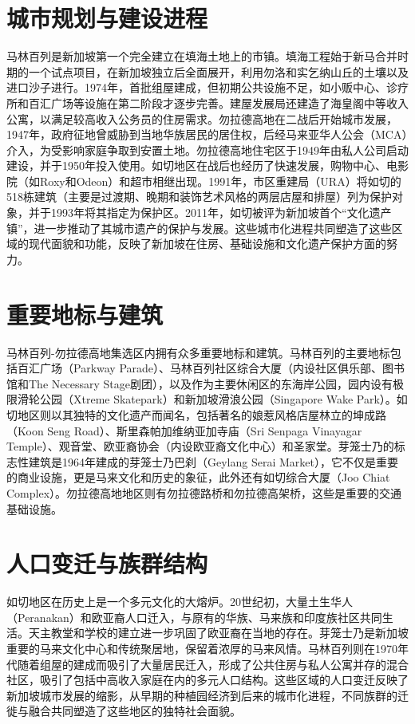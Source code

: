 \documentclass[11pt,a4paper,twoside,openany]{book}
\begin{document}
\section{城市规划与建设进程}
马林百列是新加坡第一个完全建立在填海土地上的市镇。填海工程始于新马合并时期的一个试点项目，在新加坡独立后全面展开，利用勿洛和实乞纳山丘的土壤以及进口沙子进行。1974年，首批组屋建成，但初期公共设施不足，如小贩中心、诊疗所和百汇广场等设施在第二阶段才逐步完善。建屋发展局还建造了海皇阁中等收入公寓，以满足较高收入公务员的住房需求。勿拉德高地在二战后开始城市发展，1947年，政府征地曾威胁到当地华族居民的居住权，后经马来亚华人公会（MCA）介入，为受影响家庭争取到安置土地。勿拉德高地住宅区于1949年由私人公司启动建设，并于1950年投入使用。如切地区在战后也经历了快速发展，购物中心、电影院（如Roxy和Odeon）和超市相继出现。1991年，市区重建局（URA）将如切的518栋建筑（主要是过渡期、晚期和装饰艺术风格的两层店屋和排屋）列为保护对象，并于1993年将其指定为保护区。2011年，如切被评为新加坡首个“文化遗产镇”，进一步推动了其城市遗产的保护与发展。这些城市化进程共同塑造了这些区域的现代面貌和功能，反映了新加坡在住房、基础设施和文化遗产保护方面的努力。

\section{重要地标与建筑}
马林百列-勿拉德高地集选区内拥有众多重要地标和建筑。马林百列的主要地标包括百汇广场（Parkway Parade）、马林百列社区综合大厦（内设社区俱乐部、图书馆和The Necessary Stage剧团），以及作为主要休闲区的东海岸公园，园内设有极限滑轮公园（Xtreme Skatepark）和新加坡滑浪公园（Singapore Wake Park）。如切地区则以其独特的文化遗产而闻名，包括著名的娘惹风格店屋林立的坤成路（Koon Seng Road）、斯里森帕加维纳亚加寺庙（Sri Senpaga Vinayagar Temple）、观音堂、欧亚裔协会（内设欧亚裔文化中心）和圣家堂。芽笼士乃的标志性建筑是1964年建成的芽笼士乃巴刹（Geylang Serai Market），它不仅是重要的商业设施，更是马来文化和历史的象征，此外还有如切综合大厦（Joo Chiat Complex）。勿拉德高地地区则有勿拉德路桥和勿拉德高架桥，这些是重要的交通基础设施。

\section{人口变迁与族群结构}
如切地区在历史上是一个多元文化的大熔炉。20世纪初，大量土生华人（Peranakan）和欧亚裔人口迁入，与原有的华族、马来族和印度族社区共同生活。天主教堂和学校的建立进一步巩固了欧亚裔在当地的存在。芽笼士乃是新加坡重要的马来文化中心和传统聚居地，保留着浓厚的马来风情。马林百列则在1970年代随着组屋的建成而吸引了大量居民迁入，形成了公共住房与私人公寓并存的混合社区，吸引了包括中高收入家庭在内的多元人口结构。这些区域的人口变迁反映了新加坡城市发展的缩影，从早期的种植园经济到后来的城市化进程，不同族群的迁徙与融合共同塑造了这些地区的独特社会面貌。
\end{document}
